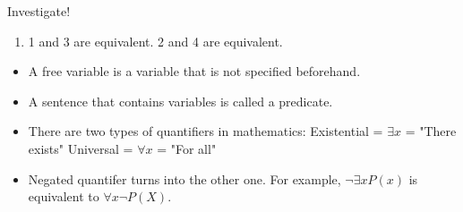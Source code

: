 \begin{mdframed}Investigate!
    \begin{enumerate}
        \item 1 and 3 are equivalent. 2 and 4 are equivalent.
    \end{enumerate}
\end{mdframed}

\begin{itemize}
    \item A free variable is a variable that is not specified beforehand.
    
    \item A sentence that contains variables is called a predicate.
    
    \item There are two types of quantifiers in mathematics:
    \newline Existential = $\exists x$ = "There exists"
    \newline Universal = $\forall x$ = "For all"
    
    \item Negated quantifer turns into the other one. For example, $\neg\exists x P(x)$ is equivalent to $\forall x \neg P(X)$.
\end{itemize}

